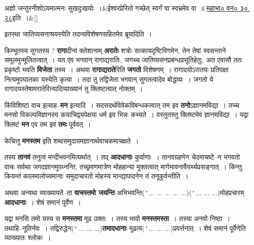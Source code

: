 \documentclass[article,12pt,a4paper]{memoir}
\newcommand{\add}[1]{($^{+}$#1)}
\begin{document}
	  \bigskip
	  \begingroup
	
	    
	    \stanza[\smallbreak]
	अज्ञो जन्तुरनीशोऽयमात्मनः सुखदुःखयोः ।&ईश्वरप्रेरितो गच्छेत् स्वर्गं वा स्वभ्रमेव वा ॥ \href{http://sarit.indology.info/?cref=MBh.3.30.28}{महाभा० वन० ३०. २८}इति ।\&[\smallbreak]


	
	  \endgroup
	

	  \pstart इतरथा जातिव्यसनाश्रयस्येति तदन्यविशेषणसहितमेव ब्रूयादिति ।
	\pend
      

	  \pstart किम्भूतस्य सुगतस्य ? \textbf{रागा}दीनां क्लेशानाम् \textbf{अरातेः} शत्रोः सत्कायदृष्टिविगमेन, तेन तेषां स्वसन्ताने समूलमुन्मूलितत्वात् । यत एव भगवान् रागाद्यरातिः, जगच्च जातिव्यसनप्रबन्धप्रसूतिहेतुः, अत एवासौ ततः प्रकृष्टो भवति \textbf{विजेता} तस्य । अथवा \textbf{रागाद्यराते}रिति \textbf{जगतो} विशेषणम् । रागादयोऽरातयः प्रतिपक्षा नित्यमुपघातका यस्येति कृत्वा । तदा तु तद्विजेता भगवान् सुगतत्वादेव बोद्धव्यः । जगतो ये रागादयस्तेषामरातेरित्यादिव्याख्यानं तु क्लिष्टत्वात् नोक्तम् ।
	\pend
      

	  \pstart किंविशिष्टा वाच इत्याह--\textbf{मन} इत्यादि । सदसदर्थविवेकविबन्धकत्वात् तम इव \textbf{तनो}ऽज्ञानमविद्या । तच्च मनसो विकल्पविज्ञानस्य कयाचिद्व्यपेक्षया धर्म इव भिन्नः कथ्यते । वस्तुतस्तु क्लिष्टमेव ज्ञानमविद्या । यद्वा क्लिष्टं \textbf{मन} एव तम इव \textbf{तमः} पूर्ववत् ।
	\pend
      

	  \pstart केचित्तु \textbf{मनस्तम} इति शब्दसमुदायमज्ञानार्थवाचकमाचक्षते ।
	\pend
      

	  \pstart तस्य \textbf{तानवं} तनुत्वं मन्दीभवनमित्यर्थात् । तद् \textbf{आदधानाः} कुर्वाणाः । तानवग्रहणेन चेदमाचष्टे--न भगवतो वाचः सर्वथा जगदज्ञानमुपध्नन्ति, तच्छ्रवणमात्रेण मोहहान्या मुक्तत्वात् मार्गभावनावैयर्थ्यप्रसङ्गात् । किन्तु कियन्तं कालमालोच्यमानाः समुदाचारतो मोहस्य मान्द्यापादनेन तं तनूकुर्वन्तीति ।
	\pend
      

	  \pstart अथवा अन्यथा व्याख्यायते--ता \textbf{वाचस्तमो जयन्ति} अभिभवन्ति\add{... ... ... ... ...}\leavevmode{}\add{... ... ...}मोहप्रचारम् \textbf{आदधानाः} । शेषं समानं पूर्वेण ।
	\pend
      

	  \pstart यद्वा मनसि तमो यस्य स \textbf{मनस्तमा} मूढ उक्तः । तस्य भावो \textbf{मनस्तमस्ता} । तस्या अनवो निष्ठा । तथाहि--नूतिर्नवः । तद्विरुद्धेन\add{... ... ...}\textbf{तमादधानाः} मूढत्व\add{... ... ...}प्रवर्त्तनात् । शेषं समानं पूर्वेणेति व्याख्यातः श्लोकः ।
	\pend
      
\end{document}
